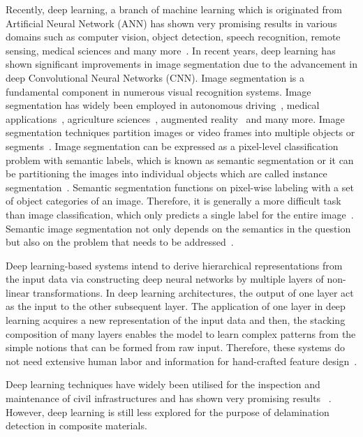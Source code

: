 Recently, deep learning, a branch of machine learning which is originated from Artificial Neural Network (ANN) has shown very promising results in various domains such as computer vision, object detection, speech recognition, remote sensing, medical sciences and many more~\cite{deng2014deep, mohanty2016using, zhang2020well, pashaei2020review}. In recent years, deep learning has shown significant improvements in image segmentation due to the advancement in deep Convolutional Neural Networks (CNN). Image segmentation is a fundamental component in numerous visual recognition systems. Image segmentation has widely been employed in autonomous driving~\cite{zhang2013understanding, cordts2016cityscapes, ros2016synthia, li2018real}, medical applications~\cite{taghanaki2020deep}, agriculture sciences~\cite{milioto2018real}, augmented reality~\cite{miksik2015semantic} and many more. Image segmentation techniques partition images or video frames into multiple objects or segments~\cite{szeliski2010computer}. Image segmentation can be expressed as a pixel-level classification problem with semantic labels, which is known as semantic segmentation or it can be partitioning the images into individual objects which are called instance segmentation~\cite{minaee2020image}. Semantic segmentation functions on pixel-wise labeling with a set of object categories of an image. Therefore, it is generally a more difficult task than image classification, which only predicts a single label for the entire image~\cite{minaee2020image}. Semantic image segmentation not only depends on the semantics in the question but also on the problem that needs to be addressed~\cite{ghosh2019understanding}.

Deep learning-based systems intend to derive hierarchical representations from the input data via constructing deep neural networks by multiple layers of non-linear transformations. In deep learning architectures, the output of one layer act as the input to the other subsequent layer. The application of one layer in deep learning acquires a new representation of the input data and then, the stacking composition of many layers enables the model to learn complex patterns from the simple notions that can be formed from raw input. Therefore, these systems do not need extensive human labor and information for hand-crafted feature design~\cite{zhao2019deep, yuan2020machine}.

Deep learning techniques have widely been utilised for the inspection and maintenance of civil infrastructures and has shown very promising results ~\cite{cha2017deep, lin2017structural, liu2019computer}. However, deep learning is still less explored for the purpose of delamination detection in composite materials.   


